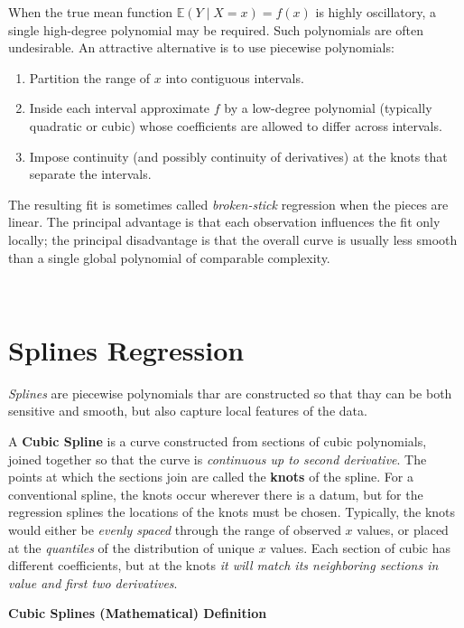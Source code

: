 \documentclass[
]{book}
\begin{document}
When the true mean function \(\mathbb{E}(Y\mid X=x)=f(x)\) is highly oscillatory, a single high-degree polynomial may be required. Such polynomials are often undesirable. An attractive alternative is to use piecewise polynomials:

\begin{enumerate}
\def\labelenumi{\arabic{enumi}.}
\item
  Partition the range of \(x\) into contiguous intervals.
\item
  Inside each interval approximate \(f\) by a low-degree polynomial (typically quadratic or cubic) whose coefficients are allowed to differ across intervals.
\item
  Impose continuity (and possibly continuity of derivatives) at the knots that separate the intervals.
\end{enumerate}

The resulting fit is sometimes called \emph{broken-stick} regression when the pieces are linear. The principal advantage is that each observation influences the fit only locally; the principal disadvantage is that the overall curve is usually less smooth than a single global polynomial of comparable complexity.

~

\section{Splines Regression}\label{splines-regression}

\emph{Splines} are piecewise polynomials thar are constructed so that thay can be both sensitive and smooth, but also capture local features of the data.

A \textbf{Cubic Spline} is a curve constructed from sections of cubic polynomials, joined together so that the curve is \emph{continuous up to second derivative}. The points at which the sections join are called the \textbf{knots} of the spline. For a conventional spline, the knots occur wherever there is a datum, but for the regression splines the locations of the knots must be chosen. Typically, the knots would either be \emph{evenly spaced} through the range of observed \(x\) values, or placed at the \emph{quantiles} of the distribution of unique \(x\) values. Each section of cubic has different coefficients, but at the knots \emph{it will match its neighboring sections in value and first two derivatives}.

\textbf{Cubic Splines (Mathematical) Definition}
\end{document}
